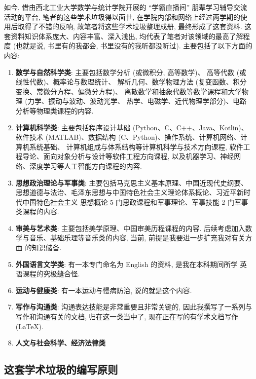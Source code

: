 如今, 借由西北工业大学数学与统计学院开展的 “学霸直播间” 朋辈学习辅导交流活动的平台,
笔者的这些学术垃圾得以面世, 在学院内部和网络上经过两学期的使用后取得了不错的反响,
故笔者将这些学术垃圾整理成册, 最终形成了这套资料. 这套资料知识体系庞大、内容丰富、深入浅出,
均代表了笔者对该领域的最高了解程度 (也就是说, 书里有的我都会, 书里没有的我听都没听过).
主要包括了以下方面的内容:
\begin{enumerate}[label=$\left.\mathrm{\Alph*}\right)$, itemsep=0pt]
    \item \textbf{数学与自然科学类}: 主要包括数学分析 (或微积分, 高等数学)、
    高等代数 (或线性代数)、概率论与数理统计、
    解析几何、数学物理方法 (复变函数、积分变换、常微分方程、偏微分方程)、
    离散数学和抽象代数等数学课程和大学物理 (力学、振动与波动、波动光学、
    热学、电磁学、近代物理学部分)、电路分析等物理类课程的内容.
    \item \textbf{计算机科学类}: 主要包括程序设计基础 (Python、C、C++、Java、Kotlin)、
    软件技术 (MATLAB)、数据结构 (C、Python)、操作系统、计算机网络、计算机系统基础、
    计算机组成与体系结构等计算机科学与技术方向课程, 
    软件工程导论、面向对象分析与设计等软件工程方向课程,
    以及机器学习、神经网络、深度学习等人工智能方向课程的内容.
    \item \textbf{思想政治理论与军事类}: 主要包括马克思主义基本原理、中国近现代史纲要、
    思想道德与法治、毛泽东思想与中国特色社会主义理论体系概论、习近平新时代中国特色社会主义
    思想概论 5 门思政课程和军事理论、军事技能 2 门军事类课程的内容.
    \item \textbf{审美与艺术类}: 主要包括美学原理、中国审美历程课程的内容.
    后续考虑加入数学与音乐、基础乐理等音乐类的内容, 当前, 前提是我要进一步扩充我对有关方面
    的知识储备.
    \item \textbf{外国语言文学类}: 有一本专门命名为 English 的资料, 是我在本科期间所学
    英语课程的究极缝合怪.
    \item \textbf{运动与健康类}: 有一本运动与慢病防治, 说的就是这个内容.
    \item \textbf{写作与沟通类}: 沟通表达技能是非常重要且非常关键的, 因此我撰写了一系列与
    写作和沟通有关的文档, 归在这一类当中了, 现在正在写的有学术文档写作 (\LaTeX).
    \item \textbf{人文与社会科学、经济法律类}
\end{enumerate}

\subsection*{这套学术垃圾的编写原则}

